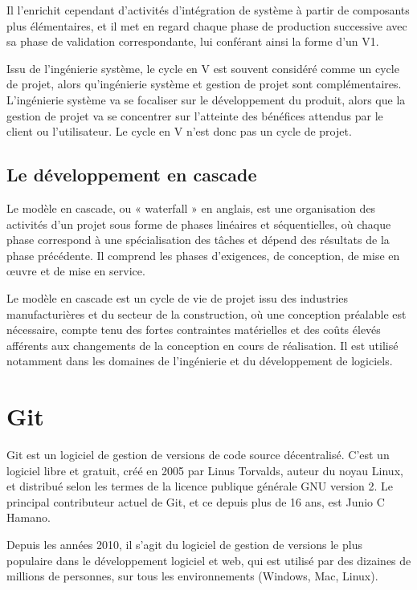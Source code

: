 Il l'enrichit cependant d'activités d'intégration de système à partir de composants plus
élémentaires, et il met en regard chaque phase de production successive avec sa phase de
validation correspondante, lui conférant ainsi la forme d'un V1.

Issu de l'ingénierie système, le cycle en V est souvent considéré comme un cycle de projet,
alors qu'ingénierie système et gestion de projet sont complémentaires. L'ingénierie système va se
focaliser sur le développement du produit, alors que la gestion de projet va se concentrer sur
l'atteinte des bénéfices attendus par le client ou l'utilisateur. Le cycle en V n'est donc pas un
cycle de projet.

\subsection{Le développement en cascade}\label{subsec:developpement-en-cascade}
Le modèle en cascade\cite{modele_en_cascade}, ou « waterfall » en anglais, est une organisation des activités d'un projet
sous forme de phases linéaires et séquentielles, où chaque phase correspond à une spécialisation
des tâches et dépend des résultats de la phase précédente. Il comprend les phases d'exigences,
de conception, de mise en œuvre et de mise en service.

Le modèle en cascade est un cycle de vie de projet issu des industries manufacturières et du secteur
de la construction, où une conception préalable est nécessaire, compte tenu des fortes contraintes
matérielles et des coûts élevés afférents aux changements de la conception en cours de réalisation.
Il est utilisé notamment dans les domaines de l'ingénierie et du développement de logiciels.

\section{Git}\label{sec:git-1}
Git\cite{git} est un logiciel de gestion de versions de code source décentralisé. C'est un logiciel libre et gratuit,
créé en 2005 par Linus Torvalds, auteur du noyau Linux, et distribué selon les termes de la
licence publique générale GNU version 2. Le principal contributeur actuel de Git, et ce
depuis plus de 16 ans, est Junio C Hamano.

Depuis les années 2010, il s’agit du logiciel de gestion de versions le plus populaire dans
le développement logiciel et web, qui est utilisé par des dizaines de millions de personnes,
sur tous les environnements (Windows, Mac, Linux).

